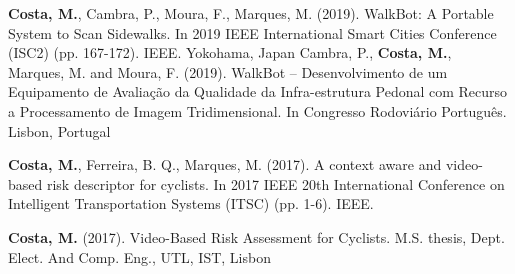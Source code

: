 
\begin{cvpublications}
  \cvpublication
    {\textbf{Costa, M.}, Cambra, P., Moura, F., Marques, M. (2019). WalkBot: A Portable System to Scan Sidewalks. In 2019 IEEE International Smart Cities Conference (ISC2) (pp. 167-172). IEEE. Yokohama, Japan}
  \cvpublication
    {Cambra, P., \textbf{Costa, M.}, Marques, M. and Moura, F. (2019). WalkBot – Desenvolvimento de um Equipamento de Avaliação da Qualidade da Infra-estrutura Pedonal com Recurso a Processamento de Imagem Tridimensional. In Congresso Rodoviário Português. Lisbon, Portugal}

\end{cvpublications}


\begin{cvpublications}
  \cvpublication
    {\textbf{Costa, M.}, Ferreira, B. Q., Marques, M. (2017). A context aware and video-based risk descriptor for cyclists. In 2017 IEEE 20th International Conference on Intelligent Transportation Systems (ITSC) (pp. 1-6). IEEE.}

\end{cvpublications}



\begin{cvpublications}
  \cvpublication
    {\textbf{Costa, M.} (2017). Video-Based Risk Assessment for Cyclists. M.S. thesis, Dept. Elect. And Comp. Eng., UTL, IST, Lisbon}

\end{cvpublications}

